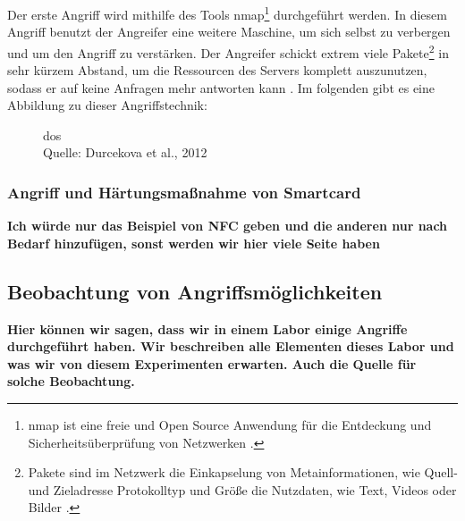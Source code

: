 Der erste Angriff wird mithilfe des Tools \acrfull{nmap}\footnote{\acrshort{nmap} ist eine freie und Open Source Anwendung
für die Entdeckung und Sicherheitsüberprüfung von Netzwerken \cite{refst:nmap}.} durchgeführt werden. In diesem Angriff benutzt
der Angreifer eine weitere Maschine, um sich selbst zu verbergen und um den Angriff zu verstärken. Der Angreifer schickt extrem viele
Pakete\footnote{Pakete sind im Netzwerk die Einkapselung von Metainformationen, wie Quell- und Zieladresse Protokolltyp 
und Größe die Nutzdaten, wie Text, Videos oder Bilder \cite{refbook:SWIS}.} in sehr kürzem Abstand, um die Ressourcen des 
Servers komplett auszunutzen, sodass er auf keine Anfragen mehr antworten kann \cite{refip:KSDD}. 
Im folgenden gibt es eine Abbildung zu dieser Angriffstechnik:

\begin{figure}[H]
  \caption{\acrfull{dos}\\ Quelle: Durcekova et al., 2012}
  \label{fig:VDSD}
\end{figure}

\subsubsection{Angriff und Härtungsmaßnahme von Smartcard}
\textbf{Ich würde nur das Beispiel von NFC geben und die anderen nur nach Bedarf hinzufügen, sonst werden wir hier
viele Seite haben}


\subsection{Beobachtung von Angriffsmöglichkeiten}
\textbf{Hier können wir sagen, dass wir in einem Labor einige Angriffe durchgeführt haben. Wir beschreiben alle Elementen
dieses Labor und was wir von diesem Experimenten erwarten. Auch die Quelle für solche Beobachtung.}

